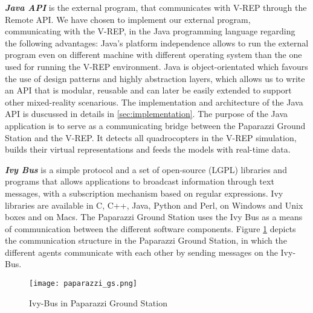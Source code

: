 \textbf{\textit{Java API}} is the external program, that communicates with V-REP through the Remote API.
We have chosen to implement our external program, communicating with the V-REP, in the Java programming language regarding the following advantages: Java's platform independence allows to run the external program even on different machine with different operating system than the one used for running the V-REP environment.  Java is object-orientated which favours the use of design patterns and highly abstraction layers, which allows us to write an API that is modular, reusable and can later be easily extended to support other mixed-reality scenarious. The implementation and architecture of the Java API is duscussed in details in \ref{sec:implementation}. The purpose of the Java application is to serve as a communicating bridge between the Paparazzi Ground Station and the V-REP. It detects all quadrocopters in the V-REP simulation, builds their virtual representations and feeds the models with real-time data.

\textbf{\textit{Ivy Bus}} is a simple protocol and a set of open-source (LGPL) libraries and programs that allows applications to broadcast information through text messages, with a subscription mechanism based on regular expressions. Ivy libraries are available in C, C++, Java, Python and Perl, on Windows and Unix boxes and on Macs. The Paparazzi Ground Station uses the Ivy Bus as a means of communication between the different software components. Figure \ref{fig:paparazziGS} depicts the communication structure in the Paparazzi Ground Station, in which the different agents communicate with each other by sending messages on the Ivy-Bus.

\begin{figure}[h!]
 \begin{center}
  \texttt{[image: paparazzi\_gs.png]}
 \end{center}
  \caption{Ivy-Bus in Paparazzi Ground Station\label{fig:paparazziGS}}
\end{figure}


 

